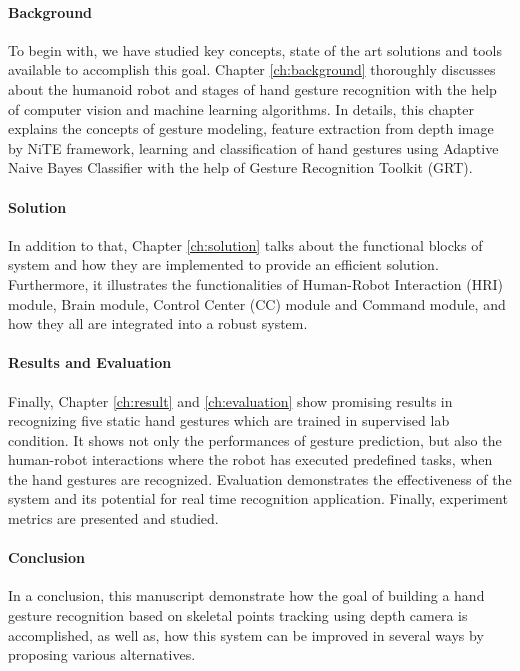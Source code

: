 \paragraph*{Background} To begin with, we have studied key concepts, state of the art solutions and tools available to accomplish this goal. Chapter \ref{ch:background} thoroughly discusses about the humanoid robot and stages of hand gesture recognition with the help of computer vision and machine learning algorithms. In details, this chapter explains the concepts of gesture modeling, feature extraction from depth image by NiTE framework, learning and classification of hand gestures using Adaptive Naive Bayes Classifier with the help of Gesture Recognition Toolkit (GRT).

\paragraph*{Solution} In addition to that, Chapter \ref{ch:solution} talks about the functional blocks of system and how they are implemented to provide an efficient solution. Furthermore, it illustrates the functionalities of Human-Robot Interaction (HRI) module, Brain module, Control Center (CC) module and Command module, and how they all are integrated into a robust system.

\paragraph*{Results and Evaluation} Finally, Chapter \ref{ch:result} and \ref{ch:evaluation} show promising results in recognizing five static hand gestures which are trained in supervised lab condition. It shows not only the performances of gesture prediction, but also the human-robot interactions where the robot has executed predefined tasks, when the hand gestures are recognized. Evaluation demonstrates the effectiveness of the system and its potential for real time recognition application. Finally, experiment metrics are presented and studied.

\paragraph*{Conclusion} In a conclusion, this manuscript demonstrate how the goal of building a hand gesture recognition based on skeletal points tracking using depth camera is accomplished, as well as, how this system can be improved in several ways by proposing various alternatives.
